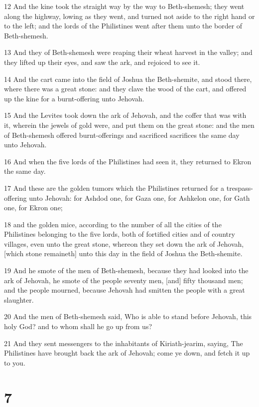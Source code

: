 \par 12 And the kine took the straight way by the way to Beth-shemesh; they went along the highway, lowing as they went, and turned not aside to the right hand or to the left; and the lords of the Philistines went after them unto the border of Beth-shemesh.
\par 13 And they of Beth-shemesh were reaping their wheat harvest in the valley; and they lifted up their eyes, and saw the ark, and rejoiced to see it.
\par 14 And the cart came into the field of Joshua the Beth-shemite, and stood there, where there was a great stone: and they clave the wood of the cart, and offered up the kine for a burnt-offering unto Jehovah.
\par 15 And the Levites took down the ark of Jehovah, and the coffer that was with it, wherein the jewels of gold were, and put them on the great stone: and the men of Beth-shemesh offered burnt-offerings and sacrificed sacrifices the same day unto Jehovah.
\par 16 And when the five lords of the Philistines had seen it, they returned to Ekron the same day.
\par 17 And these are the golden tumors which the Philistines returned for a trespass-offering unto Jehovah: for Ashdod one, for Gaza one, for Ashkelon one, for Gath one, for Ekron one;
\par 18 and the golden mice, according to the number of all the cities of the Philistines belonging to the five lords, both of fortified cities and of country villages, even unto the great stone, whereon they set down the ark of Jehovah, [which stone remaineth] unto this day in the field of Joshua the Beth-shemite.
\par 19 And he smote of the men of Beth-shemesh, because they had looked into the ark of Jehovah, he smote of the people seventy men, [and] fifty thousand men; and the people mourned, because Jehovah had smitten the people with a great slaughter.
\par 20 And the men of Beth-shemesh said, Who is able to stand before Jehovah, this holy God? and to whom shall he go up from us?
\par 21 And they sent messengers to the inhabitants of Kiriath-jearim, saying, The Philistines have brought back the ark of Jehovah; come ye down, and fetch it up to you.

\chapter{7}

